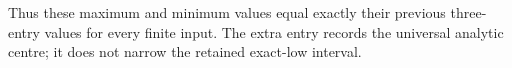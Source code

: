 Thus these maximum and minimum values equal exactly
their previous three-entry values for every finite input.
The extra entry records the universal analytic centre;
it does not narrow the retained exact-low interval.